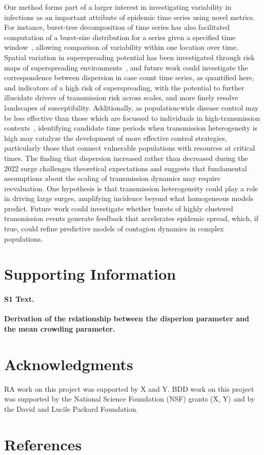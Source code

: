 \documentclass[11pt,letterpaper]{article}
\begin{document}
Our method forms part of a larger interest in investigating variability in infections as an important attribute of epidemic time series using novel metrics.
For instance, burst-tree decomposition of time series has also facilitated computation of a burst-size distribution for a series given a specified time window~\citep{jo_burst-tree_2020}, allowing comparison of variability within one location over time. 
Spatial variation in superspreading potential has been investigated through risk maps of superspreading environments~\citep{loo_identification_2021}, and future work could investigate the correspondence between dispersion in case count time series, as quantified here, and indicators of a high risk of superspreading, with the potential to further illucidate drivers of transmission risk across scales, and more finely resolve landscapes of susceptibility.
Additionally, as population-wide disease control may be less effective than those which are focussed to individuals in high-transmission contexts~\citep{lloyd2005superspreading}, identifying candidate time periods when transmission heterogeneity is high may catalyze the development of more effective control strategies, particularly those that connect vulnerable populations with resources at critical times.
The finding that dispersion increased rather than decreased during the 2022 surge challenges theoretical expectations and suggests that fundamental assumptions about the scaling of transmission dynamics may require reevaluation. 
One hypothesis is that transmission heterogeneity could play a role in driving large surges, amplifying incidence beyond what homogeneous models predict. 
Future work could investigate whether bursts of highly clustered transmission events generate feedback that accelerates epidemic spread, which, if true, could refine predictive models of contagion dynamics in complex populations.

\section*{Supporting Information}

\paragraph*{S1 Text.}
\label{S1_Text}
{\bf Derivation of the relationship between the disperion parameter and the mean crowding parameter.}

\section*{Acknowledgments}
RA work on this project was supported by X and Y. BDD work on this project was supported by the National Science Foundation (NSF) grants (X, Y) and by the David and Lucile Packard Foundation.

\clearpage
\section*{References}
 
 

\end{document}
